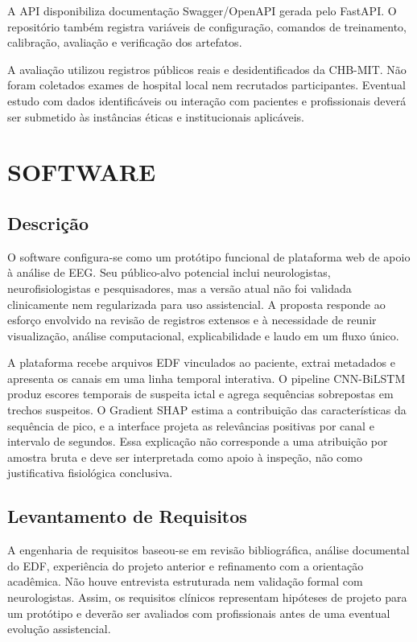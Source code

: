 A API disponibiliza documentação Swagger/OpenAPI gerada pelo FastAPI. O repositório também registra variáveis de configuração, comandos de treinamento, calibração, avaliação e verificação dos artefatos.

A avaliação utilizou registros públicos reais e desidentificados da CHB-MIT. Não foram coletados exames de hospital local nem recrutados participantes. Eventual estudo com dados identificáveis ou interação com pacientes e profissionais deverá ser submetido às instâncias éticas e institucionais aplicáveis.

\chapter{SOFTWARE}
\section{Descrição}
O software configura-se como um protótipo funcional de plataforma web de apoio à análise de EEG. Seu público-alvo potencial inclui neurologistas, neurofisiologistas e pesquisadores, mas a versão atual não foi validada clinicamente nem regularizada para uso assistencial. A proposta responde ao esforço envolvido na revisão de registros extensos e à necessidade de reunir visualização, análise computacional, explicabilidade e laudo em um fluxo único.

A plataforma recebe arquivos EDF vinculados ao paciente, extrai metadados e apresenta os canais em uma linha temporal interativa. O pipeline CNN-BiLSTM produz escores temporais de suspeita ictal e agrega sequências sobrepostas em trechos suspeitos. O Gradient SHAP estima a contribuição das características da sequência de pico, e a interface projeta as relevâncias positivas por canal e intervalo de segundos. Essa explicação não corresponde a uma atribuição por amostra bruta e deve ser interpretada como apoio à inspeção, não como justificativa fisiológica conclusiva.

\section{Levantamento de Requisitos}
A engenharia de requisitos baseou-se em revisão bibliográfica, análise documental do EDF, experiência do projeto anterior e refinamento com a orientação acadêmica. Não houve entrevista estruturada nem validação formal com neurologistas. Assim, os requisitos clínicos representam hipóteses de projeto para um protótipo e deverão ser avaliados com profissionais antes de uma eventual evolução assistencial.

